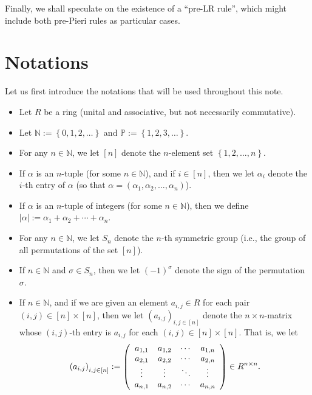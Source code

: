 \documentclass
[numbers=enddot,12pt,final,onecolumn,notitlepage,english]{scrartcl}%
\theoremstyle{definition}
\begin{document}
Finally, we shall speculate on the existence of a \textquotedblleft pre-LR
rule\textquotedblright, which might include both pre-Pieri rules as particular cases.

\section{Notations}

Let us first introduce the notations that will be used throughout this note.

\begin{itemize}
\item Let $R$ be a ring (unital and associative, but not necessarily commutative).

\item Let $\mathbb{N}:=\left\{  0,1,2,\ldots\right\}  $ and $\mathbb{P}%
:=\left\{  1,2,3,\ldots\right\}  $.

\item For any $n\in\mathbb{N}$, we let $\left[  n\right]  $ denote the
$n$-element set $\left\{  1,2,\ldots,n\right\}  $.

\item If $\alpha$ is an $n$-tuple (for some $n\in\mathbb{N}$), and if
$i\in\left[  n\right]  $, then we let $\alpha_{i}$ denote the $i$-th entry of
$\alpha$ (so that $\alpha=\left(  \alpha_{1},\alpha_{2},\ldots,\alpha
_{n}\right)  $).

\item If $\alpha$ is an $n$-tuple of integers (for some $n\in\mathbb{N}$),
then we define $\left\vert \alpha\right\vert :=\alpha_{1}+\alpha_{2}%
+\cdots+\alpha_{n}$.

\item For any $n\in\mathbb{N}$, we let $S_{n}$ denote the $n$-th symmetric
group (i.e., the group of all permutations of the set $\left[  n\right]  $).

\item If $n\in\mathbb{N}$ and $\sigma\in S_{n}$, then we let $\left(
-1\right)  ^{\sigma}$ denote the sign of the permutation $\sigma$.

\item If $n\in\mathbb{N}$, and if we are given an element $a_{i,j}\in R$ for
each pair $\left(  i,j\right)  \in\left[  n\right]  \times\left[  n\right]  $,
then we let $\left(  a_{i,j}\right)  _{i,j\in\left[  n\right]  }$ denote the
$n\times n$-matrix whose $\left(  i,j\right)  $-th entry is $a_{i,j}$ for each
$\left(  i,j\right)  \in\left[  n\right]  \times\left[  n\right]  $. That is,
we let%
\[
\left(  a_{i,j}\right)  _{i,j\in\left[  n\right]  }:=\left(
\begin{array}
[c]{cccc}%
a_{1,1} & a_{1,2} & \cdots & a_{1,n}\\
a_{2,1} & a_{2,2} & \cdots & a_{2,n}\\
\vdots & \vdots & \ddots & \vdots\\
a_{n,1} & a_{n,2} & \cdots & a_{n,n}%
\end{array}
\right)  \in R^{n\times n}.
\]



\end{itemize}
\end{document}
